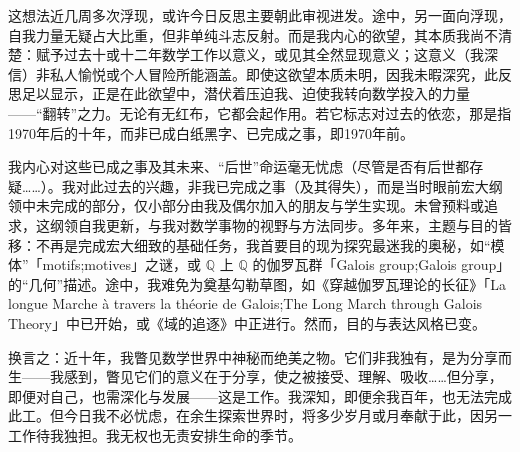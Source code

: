 这想法近几周多次浮现，或许今日反思主要朝此审视进发。途中，另一面向浮现，自我力量无疑占大比重，但非单纯斗志反射。而是我内心的欲望，其本质我尚不清楚：赋予过去十或十二年数学工作以意义，或见其全然显现意义；这意义（我深信）非私人愉悦或个人冒险所能涵盖。即使这欲望本质未明，因我未暇深究，此反思足以显示，正是在此欲望中，潜伏着压迫我、迫使我转向数学投入的力量——“翻转”之力。无论有无红布，它都会起作用。若它标志对过去的依恋，那是指1970年后的十年，而非已成白纸黑字、已完成之事，即1970年前。

我内心对这些已成之事及其未来、“后世”命运毫无忧虑（尽管是否有后世都存疑……）。我对此过去的兴趣，非我已完成之事（及其得失），而是当时眼前宏大纲领中未完成的部分，仅小部分由我及偶尔加入的朋友与学生实现。未曾预料或追求，这纲领自我更新，与我对数学事物的视野与方法同步。多年来，主题与目的皆移：不再是完成宏大细致的基础任务，我首要目的现为探究最迷我的奥秘，如“模体”「motifs;motives」之谜，或 \(\mathbb{Q}\) 上 \(\mathbb{Q}\) 的伽罗瓦群「Galois group;Galois group」的“几何”描述。途中，我难免为奠基勾勒草图，如《穿越伽罗瓦理论的长征》「La longue Marche à travers la théorie de Galois;The Long March through Galois Theory」中已开始，或《域的追逐》中正进行。然而，目的与表达风格已变。

换言之：近十年，我瞥见数学世界中神秘而绝美之物。它们非我独有，是为分享而生——我感到，瞥见它们的意义在于分享，使之被接受、理解、吸收……但分享，即便对自己，也需深化与发展——这是工作。我深知，即便余我百年，也无法完成此工。但今日我不必忧虑，在余生探索世界时，将多少岁月或月奉献于此，因另一工作待我独担。我无权也无责安排生命的季节。